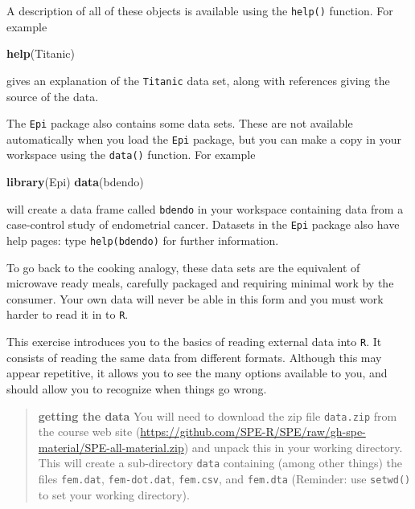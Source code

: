\documentclass[
]{book}
\newenvironment{Shaded}{\begin{snugshade}}{\end{snugshade}}
\newcommand{\FunctionTok}[1]{\textcolor[rgb]{0.13,0.29,0.53}{\textbf{#1}}}
\newcommand{\NormalTok}[1]{#1}
\theoremstyle{definition}
\theoremstyle{definition}
\theoremstyle{definition}
\theoremstyle{definition}
\theoremstyle{remark}
\begin{document}
A description of all of these objects is available using the \texttt{help()}
function. For example

\begin{Shaded}
\begin{Highlighting}[]
\FunctionTok{help}\NormalTok{(Titanic)}
\end{Highlighting}
\end{Shaded}

gives an explanation of the \texttt{Titanic} data set, along with
references giving the source of the data.

The \texttt{Epi} package also contains some data sets. These are not
available automatically when you load the \texttt{Epi} package, but
you can make a copy in your workspace using the \texttt{data()}
function. For example

\begin{Shaded}
\begin{Highlighting}[]
\FunctionTok{library}\NormalTok{(Epi)}
\FunctionTok{data}\NormalTok{(bdendo)}
\end{Highlighting}
\end{Shaded}

will create a data frame called \texttt{bdendo} in your workspace
containing data from a case-control study of endometrial cancer.
Datasets in the \texttt{Epi} package also have help pages: type
\texttt{help(bdendo)} for further information.

To go back to the cooking analogy, these data sets are the equivalent
of microwave ready meals, carefully packaged and requiring minimal
work by the consumer. Your own data will never be able in this form
and you must work harder to read it in to \texttt{R}.

This exercise introduces you to the basics of reading external data
into \texttt{R}. It consists of reading the same data from different
formats. Although this may appear repetitive, it allows you to see
the many options available to you, and should allow you to recognize
when things go wrong.

\begin{quote}
\textbf{getting the data} You will need to download the zip file \texttt{data.zip} from the course web site (\url{https://github.com/SPE-R/SPE/raw/gh-spe-material/SPE-all-material.zip}) and unpack this in your working directory. This will create a sub-directory \texttt{data} containing (among other things) the files \texttt{fem.dat}, \texttt{fem-dot.dat}, \texttt{fem.csv}, and \texttt{fem.dta} (Reminder: use \texttt{setwd()} to set
your working directory).
\end{quote}
\end{document}
